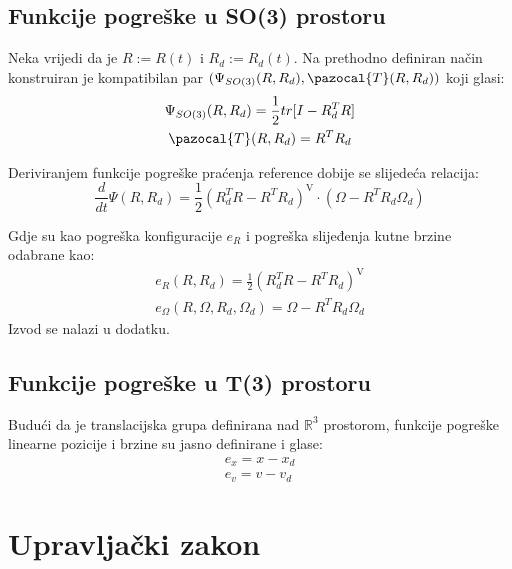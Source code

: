 \documentclass[times, utf8, diplomski]{fer}
\newcommand{\Ta}{\pazocal{T}}
\begin{document}
	\newpage
	\clearpage
	
	\subsection{Funkcije pogreške u SO(3) prostoru}
	Neka vrijedi da je $R := R(t)$ i $R_d := R_d(t)$. Na prethodno definiran način konstruiran je kompatibilan par $(\Psi_{SO(3)}(R, R_d), \Ta(R, R_d))$ koji glasi:
	\begin{gather}
		\Psi_{SO(3)}(R, R_d) = \frac{1}{2} tr[I - R_d^T R] \\
		\Ta(R, R_d) = R^T R_d
	\end{gather}
	
	Deriviranjem funkcije pogreške praćenja reference dobije se slijedeća relacija:
	\begin{equation}
		\frac{d}{dt} \Psi(R, R_d) = \frac{1}{2}(R_d^TR - R^TR_d)^{\text{V}} \cdot (\Omega - R^TR_d\Omega_d)
	\end{equation}
	
	Gdje su kao pogreška konfiguracije $e_R$ i pogreška slijeđenja kutne brzine odabrane kao: 
	\begin{gather}
		e_R(R, R_d) = \frac{1}{2}(R_d^TR - R^TR_d)^{\text{V}} \label{e_R}\\
		e_{\Omega}(R, \Omega, R_d, \Omega_d) = \Omega - R^TR_d\Omega_d \label{e_omega}
	\end{gather}
	Izvod se nalazi u dodatku.
	
	\subsection{Funkcije pogreške u T(3) prostoru}
	Budući da je translacijska grupa definirana nad $\mathbb{R}^3$ prostorom, funkcije pogreške linearne pozicije i brzine su jasno definirane i glase:
	\begin{gather}
		e_x = x - x_d \\
		e_v = v - v_d \label{e_v}
	\end{gather}
	
	\newpage
	\clearpage
	
\section{Upravljački zakon}
\end{document}
